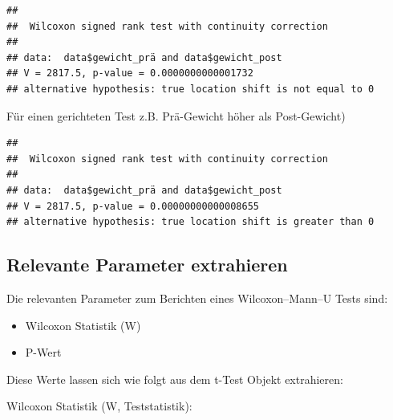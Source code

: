 \documentclass[
]{book}
\newenvironment{Shaded}{\begin{snugshade}}{\end{snugshade}}
\newcommand{\AttributeTok}[1]{\textcolor[rgb]{0.13,0.29,0.53}{#1}}
\newcommand{\FunctionTok}[1]{\textcolor[rgb]{0.13,0.29,0.53}{\textbf{#1}}}
\newcommand{\NormalTok}[1]{#1}
\newcommand{\SpecialCharTok}[1]{\textcolor[rgb]{0.81,0.36,0.00}{\textbf{#1}}}
\newcommand{\StringTok}[1]{\textcolor[rgb]{0.31,0.60,0.02}{#1}}
\providecommand{\tightlist}{%
  \setlength{\itemsep}{0pt}\setlength{\parskip}{0pt}}
\begin{document}
\begin{verbatim}
## 
##  Wilcoxon signed rank test with continuity correction
## 
## data:  data$gewicht_prä and data$gewicht_post
## V = 2817.5, p-value = 0.0000000000001732
## alternative hypothesis: true location shift is not equal to 0
\end{verbatim}

Für einen gerichteten Test z.B. Prä-Gewicht höher als Post-Gewicht)

\begin{Shaded}
\end{Shaded}

\begin{verbatim}
## 
##  Wilcoxon signed rank test with continuity correction
## 
## data:  data$gewicht_prä and data$gewicht_post
## V = 2817.5, p-value = 0.00000000000008655
## alternative hypothesis: true location shift is greater than 0
\end{verbatim}

\subsection{Relevante Parameter extrahieren}\label{relevante-parameter-extrahieren-3}

Die relevanten Parameter zum Berichten eines Wilcoxon--Mann--U Tests sind:

\begin{itemize}
\tightlist
\item
  Wilcoxon Statistik (W)
\item
  P-Wert
\end{itemize}

Diese Werte lassen sich wie folgt aus dem t-Test Objekt extrahieren:

Wilcoxon Statistik (W, Teststatistik):

\begin{Shaded}
\end{Shaded}
\end{document}
